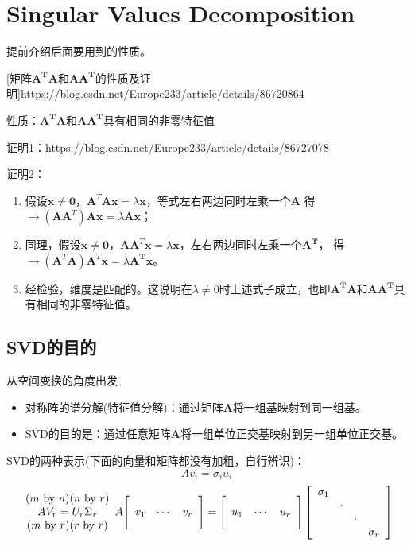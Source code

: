 \section{Singular Values Decomposition}
提前介绍后面要用到的性质。

[矩阵$\bm{A^TA}$和$\bm{AA^T}$的性质及证明]\url{https://blog.csdn.net/Europe233/article/details/86720864}

性质：$\bm{A^TA}$和$\bm{AA^T}$具有相同的非零特征值

证明1：\url{https://blog.csdn.net/Europe233/article/details/86727078}

证明2：
\begin{enumerate}
    \item 假设$\bm{x} \neq \bm{0}$，$\bm{A}^T\bm{Ax}=\lambda \bm{x}$，等式左右两边同时左乘一个$\bm{A}$
    得$\bm{\rightarrow} (\bm{AA}^T)\bm{Ax}=\lambda \bm{Ax}$；
    \item 同理，假设$\bm{x} \neq \bm{0}$，$\bm{AA}^T\bm{x}=\lambda \bm{x}$，左右两边同时左乘一个$\bm{A^T}$，
    得$\bm{\rightarrow} (\bm{A}^T\bm{A})\bm{A}^T\bm{x}=\lambda \bm{A^T}\bm{x}$。
    \item 经检验，维度是匹配的。这说明在$\lambda \neq 0$时上述式子成立，也即$\bm{A^TA}$和$\bm{AA^T}$具有相同的非零特征值。
\end{enumerate}

\subsection{SVD的目的}
从空间变换的角度出发
\begin{itemize}
    \item 对称阵的谱分解(特征值分解)：通过矩阵$\bm{A}$将一组基映射到同一组基。
    \item SVD的目的是：通过任意矩阵$\bm{A}$将一组单位正交基映射到另一组单位正交基。
\end{itemize}

SVD的两种表示(下面的向量和矩阵都没有加粗，自行辨识)：
$$A v_{i}=\sigma_{i} u_{i}$$
$$\begin{array}{c}
(m \text { by } n)(n \text { by } r) \\
A V_{r}=U_{r} \Sigma_{r} \\
(m \text { by } r)(r \text { by } r)
\end{array}
\\
A\Bigg[\begin{array}{lll}
v_{1} & \cdots & v_{r}
\end{array}\Bigg]=\Bigg[\begin{array}{lll}
u_{1} & \cdots & u_{r}
\end{array}\Bigg]\left[\begin{array}{cccc}
\sigma_{1} & & & \\
& \cdot & \\
& & \cdot & \\
& & & \sigma_{r}
\end{array}\right]$$


